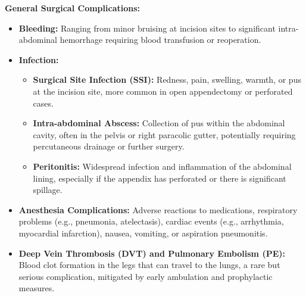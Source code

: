 \textbf{General Surgical Complications:}
\begin{itemize}
  \item \textbf{Bleeding:} Ranging from minor bruising at incision sites to significant intra-abdominal hemorrhage requiring blood transfusion or reoperation.
  \item \textbf{Infection:}
    \begin{itemize}
      \item \textbf{Surgical Site Infection (SSI):} Redness, pain, swelling, warmth, or pus at the incision site, more common in open appendectomy or perforated cases.
      \item \textbf{Intra-abdominal Abscess:} Collection of pus within the abdominal cavity, often in the pelvis or right paracolic gutter, potentially requiring percutaneous drainage or further surgery.
      \item \textbf{Peritonitis:} Widespread infection and inflammation of the abdominal lining, especially if the appendix has perforated or there is significant spillage.
    \end{itemize}
  \item \textbf{Anesthesia Complications:} Adverse reactions to medications, respiratory problems (e.g., pneumonia, atelectasis), cardiac events (e.g., arrhythmia, myocardial infarction), nausea, vomiting, or aspiration pneumonitis.
  \item \textbf{Deep Vein Thrombosis (DVT) and Pulmonary Embolism (PE):} Blood clot formation in the legs that can travel to the lungs, a rare but serious complication, mitigated by early ambulation and prophylactic measures.
\end{itemize}

